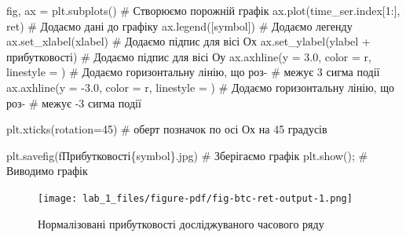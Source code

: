 \documentclass[
  letterpaper,
]{report}
\newenvironment{Shaded}{\begin{snugshade}}{\end{snugshade}}
\newcommand{\CommentTok}[1]{\textcolor[rgb]{0.37,0.37,0.37}{#1}}
\newcommand{\DecValTok}[1]{\textcolor[rgb]{0.68,0.00,0.00}{#1}}
\newcommand{\FloatTok}[1]{\textcolor[rgb]{0.68,0.00,0.00}{#1}}
\newcommand{\NormalTok}[1]{\textcolor[rgb]{0.00,0.23,0.31}{#1}}
\newcommand{\OperatorTok}[1]{\textcolor[rgb]{0.37,0.37,0.37}{#1}}
\newcommand{\SpecialCharTok}[1]{\textcolor[rgb]{0.37,0.37,0.37}{#1}}
\newcommand{\SpecialStringTok}[1]{\textcolor[rgb]{0.13,0.47,0.30}{#1}}
\newcommand{\StringTok}[1]{\textcolor[rgb]{0.13,0.47,0.30}{#1}}
\begin{document}
\begin{Shaded}
\begin{Highlighting}[]
\NormalTok{fig, ax }\OperatorTok{=}\NormalTok{ plt.subplots()                   }\CommentTok{\# Створюємо порожній графік}
\NormalTok{ax.plot(time\_ser.index[}\DecValTok{1}\NormalTok{:], ret)           }\CommentTok{\# Додаємо дані до графіку}
\NormalTok{ax.legend([symbol])                        }\CommentTok{\# Додаємо легенду}
\NormalTok{ax.set\_xlabel(xlabel)                      }\CommentTok{\# Додаємо підпис для вісі Ох}
\NormalTok{ax.set\_ylabel(ylabel }\OperatorTok{+} \StringTok{\textquotesingle{} прибутковості\textquotesingle{}}\NormalTok{)   }\CommentTok{\# Додаємо підпис для вісі Оу}
\NormalTok{ax.axhline(y }\OperatorTok{=} \FloatTok{3.0}\NormalTok{, color }\OperatorTok{=} \StringTok{\textquotesingle{}r\textquotesingle{}}\NormalTok{, linestyle }\OperatorTok{=} \StringTok{\textquotesingle{}{-}{-}\textquotesingle{}}\NormalTok{)  }\CommentTok{\# Додаємо горизонтальну лінію, що роз{-}}
                                                    \CommentTok{\# межує 3 сигма події}
\NormalTok{ax.axhline(y }\OperatorTok{=} \OperatorTok{{-}}\FloatTok{3.0}\NormalTok{, color }\OperatorTok{=} \StringTok{\textquotesingle{}r\textquotesingle{}}\NormalTok{, linestyle }\OperatorTok{=} \StringTok{\textquotesingle{}{-}{-}\textquotesingle{}}\NormalTok{) }\CommentTok{\# Додаємо горизонтальну лінію, що роз{-}}
                                                    \CommentTok{\# межує {-}3 сигма події}

\NormalTok{plt.xticks(rotation}\OperatorTok{=}\DecValTok{45}\NormalTok{)                    }\CommentTok{\# оберт позначок по осі Ох на 45 градусів}

\NormalTok{plt.savefig(}\SpecialStringTok{f\textquotesingle{}Прибутковості}\SpecialCharTok{\{}\NormalTok{symbol}\SpecialCharTok{\}}\SpecialStringTok{.jpg\textquotesingle{}}\NormalTok{)  }\CommentTok{\# Зберігаємо графік }
\NormalTok{plt.show()}\OperatorTok{;}                                \CommentTok{\# Виводимо графік}
\end{Highlighting}
\end{Shaded}

\begin{figure}[H]

{\centering \texttt{[image: lab\_1\_files/figure-pdf/fig-btc-ret-output-1.png]}

}

\caption{\label{fig-btc-ret}Нормалізовані прибутковості досліджуваного
часового ряду}

\end{figure}
\end{document}
